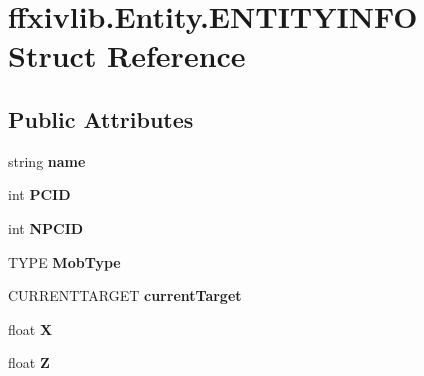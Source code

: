 \hypertarget{structffxivlib_1_1_entity_1_1_e_n_t_i_t_y_i_n_f_o}{\section{ffxivlib.\-Entity.\-E\-N\-T\-I\-T\-Y\-I\-N\-F\-O Struct Reference}
\label{structffxivlib_1_1_entity_1_1_e_n_t_i_t_y_i_n_f_o}
}
\subsection*{Public Attributes}
\begin{DoxyCompactItemize}
\item 
\hypertarget{structffxivlib_1_1_entity_1_1_e_n_t_i_t_y_i_n_f_o_afa81612dd1f40544b2bc987c0d224413}{string {\bfseries name}}\label{structffxivlib_1_1_entity_1_1_e_n_t_i_t_y_i_n_f_o_afa81612dd1f40544b2bc987c0d224413}

\item 
\hypertarget{structffxivlib_1_1_entity_1_1_e_n_t_i_t_y_i_n_f_o_af4340fb1575aed1491d220b0996277e3}{int {\bfseries P\-C\-I\-D}}\label{structffxivlib_1_1_entity_1_1_e_n_t_i_t_y_i_n_f_o_af4340fb1575aed1491d220b0996277e3}

\item 
\hypertarget{structffxivlib_1_1_entity_1_1_e_n_t_i_t_y_i_n_f_o_a201031ed99104aa84eddcacdfa0276c7}{int {\bfseries N\-P\-C\-I\-D}}\label{structffxivlib_1_1_entity_1_1_e_n_t_i_t_y_i_n_f_o_a201031ed99104aa84eddcacdfa0276c7}

\item 
\hypertarget{structffxivlib_1_1_entity_1_1_e_n_t_i_t_y_i_n_f_o_a42fd66513e50082589fa96b06b8bb5ca}{T\-Y\-P\-E {\bfseries Mob\-Type}}\label{structffxivlib_1_1_entity_1_1_e_n_t_i_t_y_i_n_f_o_a42fd66513e50082589fa96b06b8bb5ca}

\item 
\hypertarget{structffxivlib_1_1_entity_1_1_e_n_t_i_t_y_i_n_f_o_ace1351810603910b7d8793c513e805ba}{C\-U\-R\-R\-E\-N\-T\-T\-A\-R\-G\-E\-T {\bfseries current\-Target}}\label{structffxivlib_1_1_entity_1_1_e_n_t_i_t_y_i_n_f_o_ace1351810603910b7d8793c513e805ba}

\item 
\hypertarget{structffxivlib_1_1_entity_1_1_e_n_t_i_t_y_i_n_f_o_a6c542f7ef80b754b74031829ece457a3}{float {\bfseries X}}\label{structffxivlib_1_1_entity_1_1_e_n_t_i_t_y_i_n_f_o_a6c542f7ef80b754b74031829ece457a3}

\item 
\hypertarget{structffxivlib_1_1_entity_1_1_e_n_t_i_t_y_i_n_f_o_a557a202012e334a5fbc6173568931390}{float {\bfseries Z}}\label{structffxivlib_1_1_entity_1_1_e_n_t_i_t_y_i_n_f_o_a557a202012e334a5fbc6173568931390}


\end{DoxyCompactItemize}
